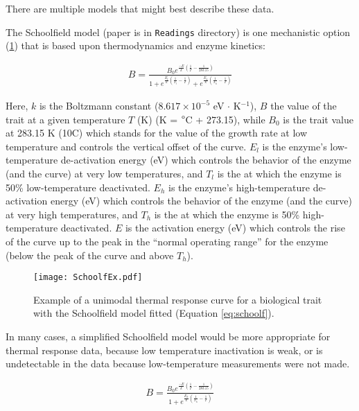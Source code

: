 There are multiple models that might best describe these data.

The Schoolfield model (paper is in {\tt Readings} directory) is one
mechanistic option (\ref{fig:schoolf}) that is based upon 
thermodynamics and enzyme kinetics:

\begin{equation} \label{eq:schoolf}
	\begin{aligned}
	  B = \frac{B_0 e^{\frac{-E}{k} (\frac{1}{T} - \frac{1}{283.15})}}
    { 1 + e^{\frac{E_l}{k} (\frac{1}{T_l} - \frac{1}{T})} + 
    e^{\frac{E_h}{k} (\frac{1}{T_h} - \frac{1}{T})}}
	\end{aligned}
\end{equation}

Here, $k$ is the Boltzmann constant ($8.617 \times 10^{-5}$ eV $\cdot$ 
K$^{-1}$), $B$ the value of the trait at a given temperature $T$ (K) (K 
= $\degree$C + 273.15), while $B_0$  is the trait value at 283.15 K 
(10\degree C) which stands for the value of the  growth rate at low 
temperature and controls the vertical offset of the curve. $E_l$ is the 
enzyme's low-temperature de-activation energy (eV) which controls the 
behavior of the enzyme (and the curve) at very low temperatures, and 
$T_l$ is the at which the enzyme is  50\% low-temperature deactivated. 
$E_h$ is the enzyme's high-temperature de-activation energy (eV) which 
controls the behavior of the enzyme (and the curve) at very high 
temperatures, and $T_h$ is the at which the enzyme is  50\% 
high-temperature deactivated. $E$ is  the activation energy (eV) which 
controls the rise of the curve up to the peak in the ``normal operating 
range'' for the enzyme (below the peak of the curve and above $T_h$). 

\begin{figure}\label{fig:schoolf}
		\centering \texttt{[image: SchoolfEx.pdf]} 
		\caption{Example of a unimodal thermal response curve for a 
		biological trait with the Schoolfield model fitted (Equation 
		\ref{eq:schoolf}).}
\end{figure}

In many cases, a simplified Schoolfield model would be more appropriate 
for thermal response data, because low temperature inactivation is 
weak, or is undetectable in the data because low-temperature 
measurements were not made.

\begin{equation} \label{eq:schoolfHi}
	\begin{aligned}
	  B = \frac{B_0 e^{\frac{-E}{k} (\frac{1}{T} - \frac{1}{283.15})}}
    { 1 +  e^{\frac{E_h}{k} (\frac{1}{T_h} - \frac{1}{T})}}
	\end{aligned}
\end{equation}

